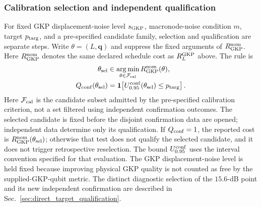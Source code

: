 \documentclass[aps,
prx,
superscriptaddress,
reprint,
longbibliography,
floatfix]{revtex4-2}
\newcounter{criterion}[section]
\begin{document}
\subsubsection{Calibration selection and independent qualification}
For fixed GKP displacement-noise level $s_{\rm GKP}$, macronode-noise condition $m$, target $p_{\rm targ}$, and a pre-specified candidate family, selection and qualification are separate steps. Write $\theta=(L,\mathbf q)$ and suppress the fixed arguments of $R^{\rm nom}_{\rm GKP}$. Here $R^{\rm nom}_{\rm GKP}$ denotes the same declared schedule cost as $R_L^{\rm GKP}$ above. The rule is
\begin{align}
\theta_{\rm sel}
&\in\operatorname*{arg\,min}_{\theta\in\mathcal F_{\rm cal}}
R^{\rm nom}_{\rm GKP}(\theta),\nonumber\\
Q_{\rm conf}(\theta_{\rm sel})
&=\mathbf 1\!\left[
U_{0.95}^{\rm conf}(\theta_{\rm sel})\le p_{\rm targ}
\right].
\label{eq:target_resource_policy_selection}
\end{align}
Here $\mathcal F_{\rm cal}$ is the candidate subset admitted by the pre-specified calibration criterion, not a set filtered using independent confirmation outcomes. The selected candidate is fixed before the disjoint confirmation data are opened; independent data determine only its qualification. If $Q_{\rm conf}=1$, the reported cost is $R^{\rm nom}_{\rm GKP}(\theta_{\rm sel})$; otherwise that test does not qualify the selected candidate, and it does not trigger retrospective reselection. The bound $U_{0.95}^{\rm conf}$ uses the interval convention specified for that evaluation. The GKP displacement-noise level is held fixed because improving physical GKP quality is not counted as free by the supplied-GKP-qubit metric. The distinct diagnostic selection of the $15.6$-dB point and its new independent confirmation are described in Sec.~\ref{sec:direct_target_qualification}.
\end{document}
